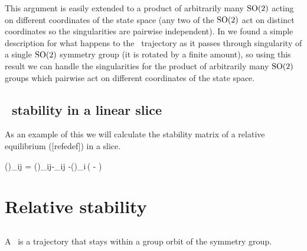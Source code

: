 {This argument is easily extended to a product of arbitrarily many $\textrm{SO}(2)$ acting on different coordinates of the state space (any two of the $\textrm{SO}(2)$ act on distinct coordinates so the singularities are pairwise independent).
In  we found a simple description for what happens to the \reducedsp\ trajectory as it passes through singularity of a single $\textrm{SO}(2)$ symmetry group (it is rotated by a finite amount), so using this result we can handle the singularities for the product of arbitrarily many $\textrm{SO}(2)$ groups which pairwise act on different coordinates of the state space.


    \ifarticle
    \else

\subsection{\Reqva\ stability in a linear slice}

As an example of this we will calculate the stability matrix of a relative equilibrium ([refedef]) in a slice.


\beq
{\MvarRed}(\sspRed)_{ij} = \Mvar(\sspRed)_{ij}-\velRel \cdot \Lg_{ij}
     -\groupTan(\sspRed)_i\,\left(
     - \velRel {}
              \right)



\section{Relative stability}
\label{sect:relStab}


\subsection{\Reqva}

A \reqv\ is a trajectory that stays
within a group orbit of the symmetry group.

}
